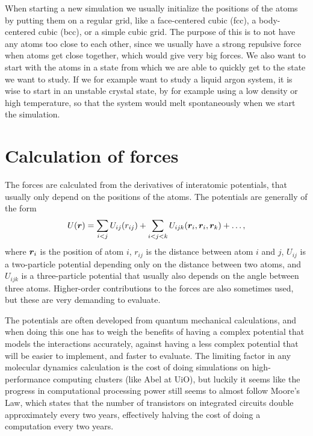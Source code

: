 When starting a new simulation we usually initialize the positions of the atoms by putting them on a regular grid, like a face-centered cubic (fcc), a body-centered cubic (bcc), or a simple cubic grid. The purpose of this is to not have any atoms too close to each other, since we usually have a strong repulsive force when atoms get close together, which would give very big forces. We also want to start with the atoms in a state from which we are able to quickly get to the state we want to study. If we for example want to study a liquid argon system, it is wise to start in an unstable crystal state, by for example using a low density or high temperature, so that the system would melt spontaneously when we start the simulation.

\section{Calculation of forces\label{sec:program:lj}}
The forces are calculated from the derivatives of interatomic potentials, that usually only depend on the positions of the atoms. The potentials are generally of the form
\begin{align*}
    U(\boldsymbol{r}) = \sum_{i<j} U_{ij}(r_{ij}) + \sum_{i<j<k} U_{ijk}(\boldsymbol{r}_i, \boldsymbol{r}_i, \boldsymbol{r}_k) + \dots,
\end{align*}
where $\boldsymbol{r}_i$ is the position of atom $i$, $r_{ij}$ is the distance between atom $i$ and $j$, $U_{ij}$ is a two-particle potential depending only on the distance between two atoms, and $U_{ijk}$ is a three-particle potential that usually also depends on the angle between three atoms. Higher-order contributions to the forces are also sometimes used, but these are very demanding to evaluate.

The potentials are often developed from quantum mechanical calculations, and when doing this one has to weigh the benefits of having a complex potential that models the interactions accurately, against having a less complex potential that will be easier to implement, and faster to evaluate. The limiting factor in any molecular dynamics calculation is the cost of doing simulations on high-performance computing clusters (like Abel at UiO), but luckily it seems like the progress in computational processing power still seems to almost follow Moore's Law\cite{mack2011moore}, which states that the number of transistors on integrated circuits double approximately every two years\cite{moore1965cramming}, effectively halving the cost of doing a computation every two years.

